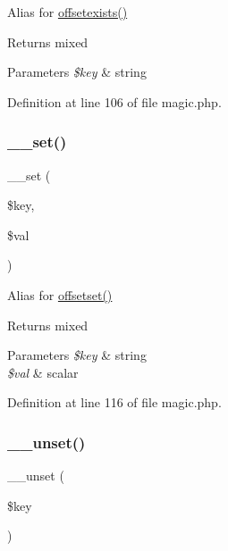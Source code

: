 Alias for \hyperlink{class_magic_a16da5af940f99a0df550a7f7c7c5d4e4}{offsetexists()} \begin{DoxyReturn}{Returns}
mixed 
\end{DoxyReturn}

\begin{DoxyParams}{Parameters}
{\em \$key} & string \\
\hline
\end{DoxyParams}


Definition at line 106 of file magic.\+php.

\hypertarget{class_magic_ae5e0d9ea041c1957ef04189b0b29657c}{}\label{class_magic_ae5e0d9ea041c1957ef04189b0b29657c} 
\subsubsection{\texorpdfstring{\+\_\+\+\_\+set()}{\_\_set()}}
{\footnotesize\ttfamily \+\_\+\+\_\+set (\begin{DoxyParamCaption}\item[{}]{\$key,  }\item[{}]{\$val }\end{DoxyParamCaption})}

Alias for \hyperlink{class_magic_a67693a9cff0abdfbbd353c36c00fb8d3}{offsetset()} \begin{DoxyReturn}{Returns}
mixed 
\end{DoxyReturn}

\begin{DoxyParams}{Parameters}
{\em \$key} & string \\
\hline
{\em \$val} & scalar \\
\hline
\end{DoxyParams}


Definition at line 116 of file magic.\+php.

\hypertarget{class_magic_a41af7dd29c879b4c30978876ebdf4ba7}{}\label{class_magic_a41af7dd29c879b4c30978876ebdf4ba7} 
\subsubsection{\texorpdfstring{\+\_\+\+\_\+unset()}{\_\_unset()}}
{\footnotesize\ttfamily \+\_\+\+\_\+unset (\begin{DoxyParamCaption}\item[{}]{\$key }\end{DoxyParamCaption})}

